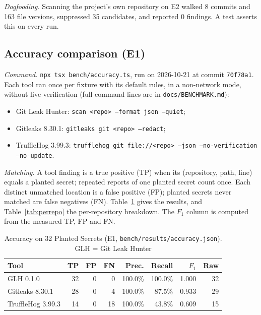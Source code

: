 \documentclass[conference]{IEEEtran}
\newcommand{\tool}{Git Leak Hunter}
\newcommand{\code}[1]{\texttt{#1}}
\begin{document}
\emph{Dogfooding.} Scanning the project's own repository on E2 walked 8 commits and 163 file
versions, suppressed 35 candidates, and reported 0 findings. A test asserts this on every run.

\subsection{Accuracy comparison (E1)}
\emph{Command.} \code{npx tsx bench/accuracy.ts}, run on 2026-10-21 at commit \code{70f78a1}.
Each tool ran once per fixture with its default rules, in a non-network mode, without live
verification (full command lines are in \code{docs/BENCHMARK.md}):
\begin{itemize}
\item \tool{}: \code{scan <repo> --format json --quiet};
\item Gitleaks 8.30.1: \code{gitleaks git <repo> --redact};
\item TruffleHog 3.99.3: \code{trufflehog git file://<repo> --json --no-verification --no-update}.
\end{itemize}
\emph{Matching.} A tool finding is a true positive (TP) when its (repository, path, line) equals a
planted secret; repeated reports of one planted secret count once. Each distinct unmatched
location is a false positive (FP); planted secrets never matched are false negatives (FN).
Table~\ref{tab:accuracy} gives the results, and Table~\ref{tab:perrepo} the per-repository
breakdown. The $F_1$ column is computed from the measured TP, FP and FN.

\begin{table}[t]
\centering
\caption{Accuracy on 32 Planted Secrets (E1, \code{bench/results/accuracy.json}). GLH = \tool{}}
\label{tab:accuracy}
\footnotesize
\setlength{\tabcolsep}{3pt}
\begin{tabular}{@{}lrrrrrrr@{}}
\toprule
Tool & TP & FP & FN & Prec. & Recall & $F_1$ & Raw \\
\midrule
GLH 0.1.0 & 32 & 0 & 0 & 100.0\% & 100.0\% & 1.000 & 32 \\
Gitleaks 8.30.1 & 28 & 0 & 4 & 100.0\% & 87.5\% & 0.933 & 29 \\
TruffleHog 3.99.3 & 14 & 0 & 18 & 100.0\% & 43.8\% & 0.609 & 15 \\
\bottomrule
\end{tabular}
\end{table}
\end{document}
